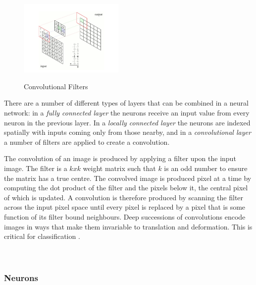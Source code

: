 \documentclass[a4paper,11pt,titlepage]{article}
\begin{document}
		\begin{figure}[H]
    			\centering	
    			{{\includegraphics[width=0.45\textwidth]
    				{img/convolutional_network.png} 
    			}}%
    			\caption{Convolutional Filters}%
    			\label{fig:convfilters}
		\end{figure}		

		\par 
		There are a number of different types of layers that can be combined in a neural network: in a \textit{fully connected layer} the neurons receive an input value from every neuron in the previous layer. In a \textit{locally connected layer} the neurons are indexed spatially with inputs coming only from those nearby, and in a \textit{convolutional layer} a number of filters are applied to create a convolution. 
		\par
		The convolution of an image is produced by applying a filter upon the input image. The filter is a $k x k$ weight matrix such that $ k $ is an odd number to ensure the matrix has a true centre. The convolved image is produced pixel at a time by computing the dot product of the filter and the pixels below it, the central pixel of which is updated. A convolution is therefore produced by scanning the filter across the input pixel space until every pixel is replaced by a pixel that is some function of its filter bound neighbours. Deep successions of convolutions encode images in ways that make them invariable to translation and deformation. This is critical for classification \cite{Bruna2012}.
\\\
\\\

\subsubsection{Neurons}
		
		\begin{figure}[H]
    			\centering	
    			\qquad
    			\caption{ }%
    			\label{fig:biologicalNeurons}
		\end{figure}
				
\end{document}
